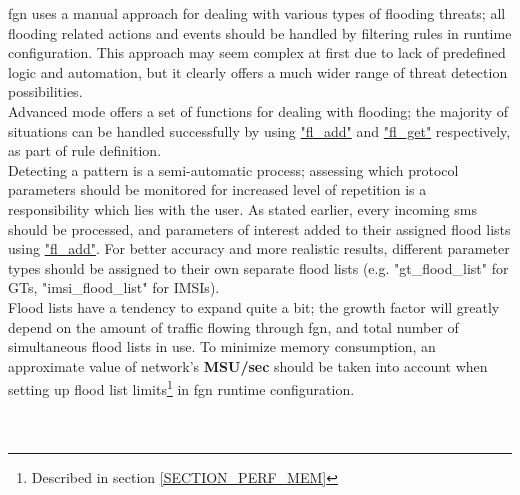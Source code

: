 \documentclass[a4paper,latin]{paper}
\begin{document}
\acrfull{fgn} uses a manual approach for dealing with various types of flooding threats; all flooding related actions and events should be handled 
by filtering \glspl{rule} in runtime configuration. This approach may seem complex at first due to lack of predefined logic and automation, but
it clearly offers a much wider range of threat detection possibilities.\\

Advanced mode offers a set of functions for dealing with flooding; the majority of situations can be handled successfully by using \underline{"fl\_add"} and 
\underline{"fl\_get"} respectively, as part of \gls{rule} definition. \\

Detecting a pattern is a semi-automatic process; assessing which protocol parameters should be monitored for increased level of repetition is a 
responsibility which lies with the user. As stated earlier, every incoming \acrshort{sms} should be processed, and parameters of interest added to their 
assigned flood lists using \underline{"fl\_add"}. For better accuracy and more realistic results, different parameter types should be assigned to their
own separate flood lists (e.g. "gt\_flood\_list" for GTs, "imsi\_flood\_list" for IMSIs).\\

Flood lists have a tendency to expand quite a bit; the growth factor will greatly depend on the amount of traffic flowing through \acrfull{fgn}, and
total number of simultaneous flood lists in use. To minimize memory consumption, an approximate value of network's \textbf{MSU/sec} should be taken into 
account when setting up flood list limits\footnote{Described in section \ref{SECTION_PERF_MEM}} in \acrshort{fgn} runtime configuration.  \\\\


\\
\end{document}
